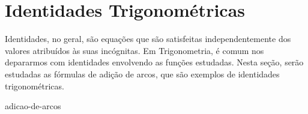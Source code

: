 \section{Identidades Trigonométricas}

Identidades, no geral, são equações que são satisfeitas independentemente dos valores atribuídos às
suas incógnitas. Em Trigonometria, é comum nos depararmos com identidades envolvendo as funções estudadas.
Nesta seção, serão estudadas as fórmulas de adição de arcos, que são exemplos de identidades trigonométricas.

{adicao-de-arcos}